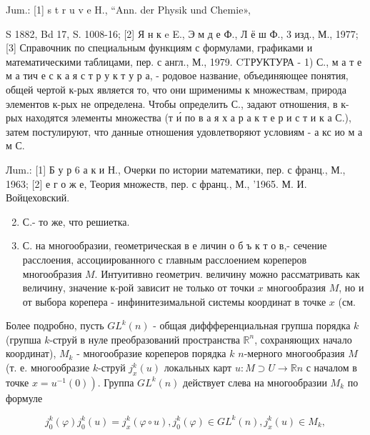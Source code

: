 \documentclass[10pt]{article}
\begin{document}
Jum.: [1] s t r u v e H., “Ann. der Physik und Chemie»,

S 1882, Bd 17, S. 1008-16; [2] Я н к e E., Э м д е Ф., Л ё ш Ф., 3 изд., М., 1977; [3] Справочник по специальным функциям с формулами, графиками и математическими таблицами, пер. с англ., М., 1979. CTРУКТУРА - 1) С., м а т е м а тич е с к а я с т р у к т у р а, - родовое название, объединяющее понятия, общей чертой к-рых является то, что они шрименимы к множествам, природа элементов к-рых не определена. Чтобы определить С., задают отношения, в к-рых находятся элементы множества (т и́ по в а я х а р а к т е р и с т и к а С.), затем постулируют, что данные отношения удовлетворяют условиям - а кс ио м а м С.



Лum.: [1] Б у р 6 а к и Н., Очерки по истории математики, пер. с франц., М., 1963; [2] е г о ж е, Теория множеств, пер. с франц., М., '1965. М. И. Войцеховский.



\begin{enumerate}

  \setcounter{enumi}{1}

  \item С.- то же, что решиетка.



  \item С. на многообразии, геометрическая в е личин о б ъ к т о в,- сечение расслоения, ассоциированного с главным расслоением кореперов многообразия $M$. Интуитивно геометрич. величину можно рассматривать как величину, значение к-рой зависит не только от точки $x$ многообразия $M$, но и от выбора корепера - инфинитезимальной системы координат в точке $x$ (см.



\end{enumerate}



Более подробно, пусть $G L^{k}(n)$ - общая диффференциальная групша порядка $k$ (групша $k$-струй в нуле преобразований пространства $\mathbb{R}^{n}$, сохраняющих начало координат), $M_{k}$ - многообразие кореперов порядка $k$ $n$-мерного многообразия $M$ (т. е. многообразие $k$-струй $j_{x}^{k}(u)$ локальных карт $u: M \supset U \rightarrow \mathbb{R} n$ с началом в точке $\left.x=u^{-1}(0)\right)$. Группа $G L^{k}(n)$ действует слева на многообразии $M_{k}$ по формуле



\[

j_{0}^{k}(\varphi) j_{0}^{k}(u)=j_{x}^{k}(\varphi \circ u), j_{0}^{k}(\varphi) \in G L^{k}(n), j_{x}^{k}(u) \in M_{k},

\]
\end{document}
